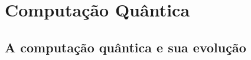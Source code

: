 \section{Computação Quântica} 
\label{quantum_comp}
\subsection{A computação quântica e sua evolução}
\newpage